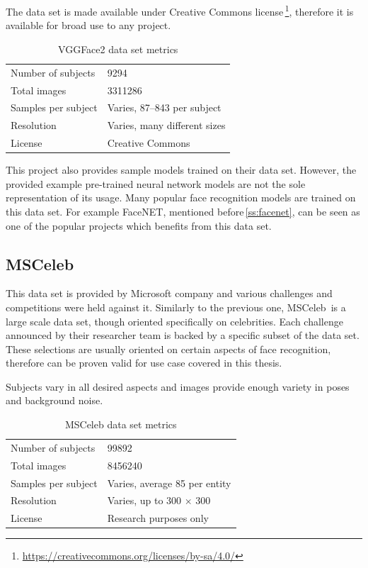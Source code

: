 The data set is made available under Creative Commons license\,\footnote{\url{https://creativecommons.org/licenses/by-sa/4.0/}}, therefore it is available for broad use to any project.

\begin{table}[ht]
    \centering
    \begin{tabularx}{.8\textwidth}{l|X}
        \toprule
        Number of subjects & \num{9294} \\
        Total images & \num{3311286} \\
        Samples per subject & Varies, 87--843 per subject \\
        Resolution & Varies, many different sizes \\
        License & Creative Commons \\
        \bottomrule
    \end{tabularx}
    \caption{VGGFace2 data set metrics}
\end{table}

This project also provides sample models trained on their data set. However, the provided example pre-trained neural network models are not the sole representation of its usage. Many popular face recognition models are trained on this data set. For example FaceNET, mentioned before\,\ref{ss:facenet}, can be seen as one of the popular projects which benefits from this data set.

\subsection{MSCeleb}

This data set is provided by Microsoft company and various challenges and competitions were held against it. Similarly to the previous one, MSCeleb\,\cite{msceleb} is a large scale data set, though oriented specifically on celebrities. Each challenge announced by their researcher team is backed by a specific subset of the data set. These selections are usually oriented on certain aspects of face recognition, therefore can be proven valid for use case covered in this thesis.

Subjects vary in all desired aspects and images provide enough variety in poses and background noise.

\begin{table}[ht]
    \centering
    \begin{tabularx}{.8\textwidth}{l|X}
        \toprule
        Number of subjects & \num{99892} \\
        Total images & \num{8456240} \\
        Samples per subject & Varies, average 85 per entity \\
        Resolution & Varies, up to 300 $\times$ 300 \\
        License & Research purposes only \\
        \bottomrule
    \end{tabularx}
    \caption{MSCeleb data set metrics}
\end{table}

